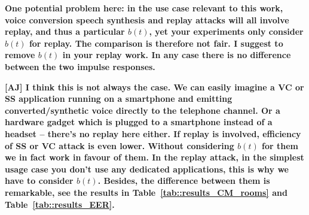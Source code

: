 

{\bfseries One potential problem here: in the use case relevant to this work, voice conversion speech synthesis and replay attacks will all involve replay, and thus a particular $b(t)$, yet your experiments only consider $b(t)$ for replay.  The comparison is therefore not fair.  I suggest to remove $b(t)$ in your replay work.  In any case there is no difference between the two impulse responses.}

{\bfseries [AJ] I think this is not always the case. We can easily imagine a VC or SS application running on a smartphone and emitting converted/synthetic voice directly to the telephone channel. Or a hardware gadget which is plugged to a smartphone instead of a headset -- there's no replay here either. If replay is involved, efficiency of SS or VC attack is even lower. Without considering $b(t)$ for them we in fact work in favour of them. In the replay attack, in the simplest usage case you don't use any dedicated applications, this is why we have to consider $b(t)$. Besides, the difference between them is remarkable, see the results in Table~\ref{tab::results_CM_rooms} and Table~\ref{tab::results_EER}.}
